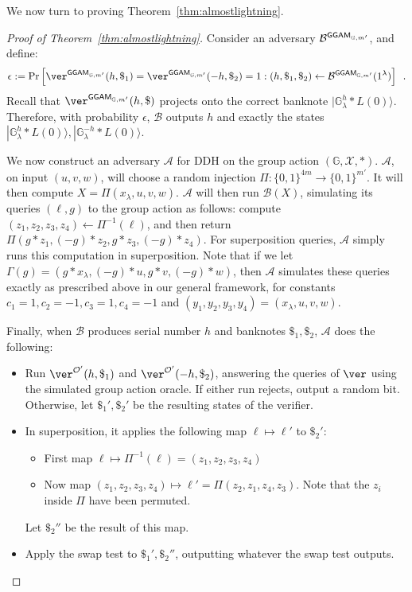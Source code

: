 \documentclass{article}\usepackage[a4paper,margin=20mm]{geometry}
\numberwithin{theorem}{section}
\numberwithin{equation}{section}
\newcommand{\G}{\mathbb{G}}
\newcommand{\As}{{\mathcal{A}}}
\newcommand{\Bs}{{\mathcal{B}}}
\newcommand{\Os}{{\mathcal{O}}}
\newcommand{\Xs}{{\mathcal{X}}}
\newcommand{\GGAM}{{\sf GGAM}}
\begin{document}
\noindent We now turn to proving Theorem~\ref{thm:almostlightning}.
\begin{proof}[Proof of Theorem~\ref{thm:almostlightning}]Consider an adversary $\Bs^{\GGAM_{\G,m'}}$, and define: \[\epsilon:=\Pr\left[\ver^{\GGAM_{\G,m'}}(h,\$_1)=\ver^{\GGAM_{\G,m'}}(-h,\$_2)=1:(h,\$_1,\$_2)\gets\Bs^{\GGAM_{\G,m'}}(1^\lambda)\right]\enspace .\]
	Recall that $\ver^{\GGAM_{\G,m'}}(h,\$)$ projects onto the correct banknote $|\G^h_\lambda*L(0)\rangle$. Therefore, with probability $\epsilon$, $\Bs$ outputs $h$ and exactly the states $|\G^h_\lambda*L(0)\rangle,|\G^{-h}_\lambda*L(0)\rangle$.
	
	We now construct an adversary $\As$ for DDH on the group action $(\G,\Xs,*)$. $\As$, on input $(u,v,w)$, will choose a random injection $\Pi:\{0,1\}^{4m}\rightarrow\{0,1\}^{m'}$. It will then compute $X=\Pi(x_\lambda,u,v,w)$. $\As$ will then run $\Bs(X)$, simulating its queries $(\ell,g)$ to the group action as follows: compute $(z_1,z_2,z_3,z_4)\gets\Pi^{-1}(\ell)$, and then return $\Pi(g*z_1,(-g)*z_2,g*z_3,(-g)*z_4)$. For superposition queries, $\As$ simply runs this computation in superposition. Note that if we let $\Gamma(g)=(g*x_\lambda,(-g)*u,g*v,(-g)*w)$, then $\As$ simulates these queries exactly as prescribed above in our general framework, for constants $c_1=1,c_2=-1,c_3=1,c_4=-1$ and $(y_1,y_2,y_3,y_4)=(x_\lambda,u,v,w)$.
	
	Finally, when $\Bs$ produces serial number $h$ and banknotes $\$_1,\$_2$, $\As$ does the following:
	\begin{itemize}
		\item Run $\ver^{\Os'}(h,\$_1)$ and $\ver^{\Os'}(-h,\$_2)$, answering the queries of $\ver$ using the simulated group action oracle. If either run rejects, output a random bit. Otherwise, let $\$_1',\$_2'$ be the resulting states of the verifier.
		\item In superposition, it applies the following map $\ell\mapsto\ell'$ to $\$_2'$:
		\begin{itemize}
			\item First map $\ell\mapsto\Pi^{-1}(\ell)=(z_1,z_2,z_3,z_4)$
			\item Now map $(z_1,z_2,z_3,z_4)\mapsto\ell'=\Pi(z_2,z_1,z_4,z_3)$. Note that the $z_i$ inside $\Pi$ have been permuted.
		\end{itemize}
		Let $\$_2''$ be the result of this map.
		\item Apply the swap test to $\$_1',\$_2''$, outputting whatever the swap test outputs.
	\end{itemize}
	

\end{proof}
\end{document}
